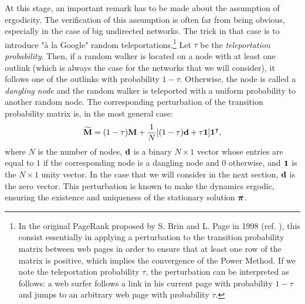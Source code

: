 At this stage, an important remark has to be made about the assumption of ergodicity. The verification of this assumption is often far from being obvious, especially in the case of big undirected networks. The trick in that case is to introduce "à la Google" random teleportations.\footnote{In the original PageRank proposed by S. Brin and L. Page in 1998 (ref. \cite{grin1998anatomy}), this consist essentially in applying a perturbation to the transition probability matrix between web pages in order to ensure that at least one row of the matrix is positive, which implies the convergence of the Power Method. If we note the teleportation probability $\tau$, the perturbation can be interpreted as follows: a web surfer follows a link in his current page with probability $1-\tau$ and jumps to an arbitrary web page with probability $\tau$.} Let $\tau$ be the \textit{teleportation probability}. Then, if a random walker is located on a node with at least one outlink (which is always the case for the networks that we will consider), it follows one of the outlinks with probability $1-\tau$. Otherwise, the node is called a \textit{dangling node} and the random walker is teleported with a uniform probability to another random node. The corresponding perturbation of the transition probability matrix is, in the most general case:
\begin{equation} \label{eq:M_teleport}
	\widetilde{\mathbf M} = (1-\tau)\mathbf M + \frac{1}{N}[(1-\tau)\mathbf d + \tau \mathbf 1]\mathbf 1^{\intercal},
\end{equation}
where $N$ is the number of nodes, $\mathbf d$ is a binary $N \times 1$ vector whose entries are equal to $1$ if the corresponding node is a dangling node and $0$ otherwise, and $\mathbf 1$ is the $N \times 1$ unity vector. In the case that we will consider in the next section, $\mathbf d$ is the zero vector. This perturbation is known to make the dynamics ergodic, ensuring the existence and uniqueness of the stationary solution $\boldsymbol \pi$.

